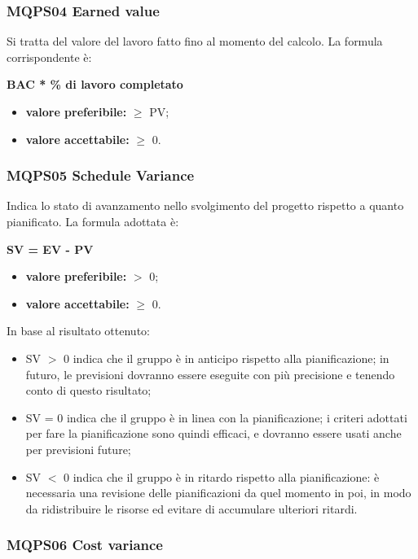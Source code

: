 \subsubsection{MQPS04 Earned value}\label{2.1.3.4}
Si tratta del valore del lavoro fatto fino al momento del calcolo.
La formula corrispondente è:
\begin{center}
	\textbf{BAC * \% di lavoro completato}
\end{center}
\begin{itemize}
	\item \textbf{valore preferibile:} $\geq$ PV;
	\item \textbf{valore accettabile:} $\geq$ 0.
\end{itemize}

\subsubsection{MQPS05 Schedule Variance}\label{2.1.3.5}
Indica lo stato di avanzamento nello svolgimento del progetto rispetto a quanto pianificato.
La formula adottata è:
\begin{center}
	\textbf{SV = EV - PV}
\end{center}
\begin{itemize}
	\item \textbf{valore preferibile:} $>$ 0;
	\item \textbf{valore accettabile:} $\geq$ 0.
\end{itemize}
In base al risultato ottenuto:
\begin{itemize}
	\item SV $>$ 0  indica che il gruppo è in anticipo rispetto alla pianificazione; in futuro,
	le previsioni dovranno essere eseguite con più precisione e tenendo conto di questo
	risultato;
	\item SV = 0  indica che il gruppo è in linea con la pianificazione; i criteri adottati per
	fare la pianificazione sono quindi efficaci, e dovranno essere usati anche per previsioni
	future;
	\item SV $<$ 0 indica che il gruppo è in ritardo rispetto alla pianificazione: è necessaria
	una revisione delle pianificazioni da quel momento in poi, in modo da ridistribuire le
	risorse ed evitare di accumulare ulteriori ritardi.
\end{itemize}

\subsubsection{MQPS06 Cost variance}\label{2.1.3.6}

